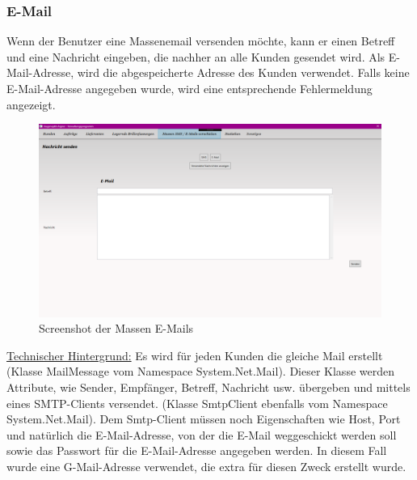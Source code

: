 \subsubsection{E-Mail}
Wenn der Benutzer eine Massenemail versenden möchte, kann er einen Betreff und eine Nachricht eingeben, die nachher an alle Kunden gesendet wird. Als E-Mail-Adresse, wird die abgespeicherte Adresse des Kunden verwendet. Falls keine E-Mail-Adresse angegeben wurde, wird eine entsprechende Fehlermeldung angezeigt.

\begin{figure}[H]
\begin{center}
	\includegraphics[scale=.25]{images/Massenemail.png}
\end{center}
	\caption{Screenshot der Massen E-Mails}
	\label{fig:sample}
\end{figure}
\underline{Technischer Hintergrund:}
\medskip
\linebreak
Es wird für jeden Kunden die gleiche Mail erstellt (Klasse MailMessage vom Namespace System.Net.Mail). Dieser Klasse werden Attribute, wie Sender, Empfänger, Betreff, Nachricht usw. übergeben und mittels eines SMTP-Clients versendet. (Klasse SmtpClient ebenfalls vom Namespace System.Net.Mail). Dem Smtp-Client müssen noch Eigenschaften wie Host, Port und natürlich die E-Mail-Adresse, von der die E-Mail weggeschickt werden soll sowie das Passwort für die E-Mail-Adresse angegeben werden. In diesem Fall wurde eine G-Mail-Adresse verwendet, die extra für diesen Zweck erstellt wurde.


